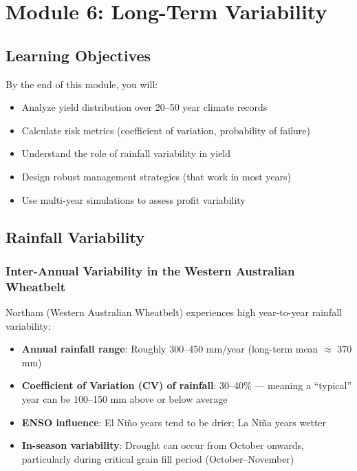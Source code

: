 
\chapter{Module 6: Long-Term Variability}
\label{ch:module6}

\section{Learning Objectives}

By the end of this module, you will:
\begin{itemize}
  \item Analyze yield distribution over 20--50 year climate records
  \item Calculate risk metrics (coefficient of variation, probability of failure)
  \item Understand the role of rainfall variability in yield
  \item Design robust management strategies (that work in most years)
  \item Use multi-year simulations to assess profit variability
\end{itemize}

\section{Rainfall Variability}

\subsection{Inter-Annual Variability in the Western Australian Wheatbelt}

Northam (Western Australian Wheatbelt) experiences high year-to-year rainfall variability:

\begin{itemize}
  \item \textbf{Annual rainfall range}: Roughly 300--450 mm/year (long-term mean $\approx$ 370 mm)
  \item \textbf{Coefficient of Variation (CV) of rainfall}: 30--40\% --- meaning a ``typical'' year can be 100--150 mm above or below average
  \item \textbf{ENSO influence}: El Ni\~{n}o years tend to be drier; La Ni\~{n}a years wetter
  \item \textbf{In-season variability}: Drought can occur from October onwards, particularly during critical grain fill period (October--November)
\end{itemize}

